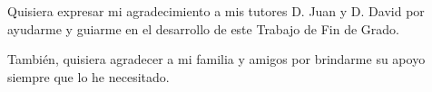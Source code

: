 \begin{agradecimientos}
Quisiera expresar mi agradecimiento a mis tutores D. Juan y D. David por ayudarme y guiarme en el desarrollo de este Trabajo de Fin de Grado.

También, quisiera agradecer a mi familia y amigos por brindarme su apoyo siempre que lo he necesitado.
\end{agradecimientos}